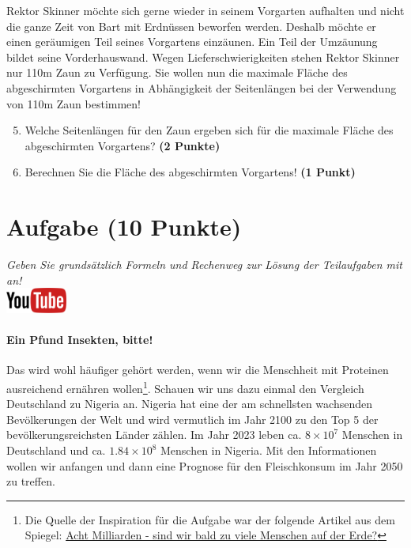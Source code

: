\documentclass[a4paper, 9pt]{scrartcl}\usepackage[]{graphicx}\usepackage[]{xcolor}
\begin{document}
Rektor Skinner m{\"o}chte sich gerne wieder in seinem Vorgarten aufhalten und
nicht die ganze Zeit von Bart mit Erdn{\"u}ssen beworfen werden. Deshalb m{\"o}chte
er einen ger{\"a}umigen Teil seines Vorgartens einz{\"a}unen. Ein Teil der
Umz{\"a}unung bildet seine Vorderhauswand. Wegen Lieferschwierigkeiten stehen
Rektor Skinner nur 110m Zaun zu Verf{\"u}gung. Sie wollen nun die
maximale Fl{\"a}che des abgeschirmten Vorgartens in Abh{\"a}ngigkeit der
Seitenl{\"a}ngen bei der Verwendung von 110m Zaun bestimmen!

\begin{enumerate}
  \setcounter{enumi}{4}  
\item  Welche Seitenl{\"a}ngen f{\"u}r den Zaun ergeben sich f{\"u}r die
  maximale Fl{\"a}che des abgeschirmten Vorgartens? \textbf{(2 Punkte)}
\item Berechnen Sie die Fl{\"a}che des abgeschirmten Vorgartens! \textbf{(1
    Punkt)}
\end{enumerate}

 
\clearpage

\section{Aufgabe \hfill (10 Punkte)}

\textit{Geben Sie grunds{\"a}tzlich Formeln und Rechenweg zur L{\"o}sung der
  Teilaufgaben mit an!} \\[1Ex]

\hfill\href{https://youtu.be/OhyuH6hzEhY}{\includegraphics[width = 2cm]{img/youtube}} %
\hspace{2Ex}




\paragraph{Ein Pfund Insekten, bitte!} Das wird wohl h{\"a}ufiger geh{\"o}rt
werden, wenn wir die Menschheit mit Proteinen ausreichend ern{\"a}hren
wollen\footnote{Die Quelle der Inspiration f{\"u}r die Aufgabe war der folgende
  Artikel aus dem Spiegel:
  \href{https://www.spiegel.de/ausland/ueberbevoelkerung-acht-milliarden-sind-wir-bald-zu-viele-menschen-auf-der-erde-a-3f20c7bc-3d60-4440-9f52-eb338db207f5}{Acht
    Milliarden - sind wir bald zu viele Menschen auf der Erde?}}. Schauen
wir uns dazu einmal den Vergleich Deutschland zu Nigeria an. Nigeria hat
eine der am schnellsten wachsenden Bev{\"o}lkerungen der Welt und wird
vermutlich im Jahr 2100 zu den Top 5 der bev{\"o}lkerungsreichsten L{\"a}nder
z{\"a}hlen. Im Jahr 2023 leben ca. \ensuremath{8\times 10^{7}} Menschen in
Deutschland und ca. \ensuremath{1.84\times 10^{8}} Menschen in Nigeria. Mit den
Informationen wollen wir anfangen und dann eine Prognose f{\"u}r den
Fleischkonsum im Jahr 2050 zu treffen. \\ 
\end{document}
